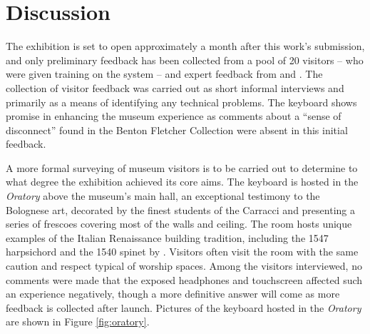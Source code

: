 \section{Discussion}\label{context}

The exhibition is set to open approximately a month after this work's submission, and only preliminary feedback has been collected from a pool of 20 visitors -- who were given training on the system -- and expert feedback from  and .
The collection of visitor feedback was carried out as short informal interviews and primarily as a means of identifying any technical problems.
The keyboard shows promise in enhancing the museum experience as comments about a ``sense of disconnect'' found in the Benton Fletcher Collection \cite{McAlpine2014} were absent in this initial feedback.


A more formal surveying of museum visitors is to be carried out to determine to what degree the exhibition achieved its core aims.
The keyboard is hosted in the \emph{Oratory} above the museum's main hall, an exceptional testimony to the Bolognese art, decorated by the finest students of the Carracci and presenting a series of frescoes covering most of the walls and ceiling. The room hosts unique examples of the Italian Renaissance building tradition, including the 1547 harpsichord and the 1540 spinet by . Visitors often visit the room with the same caution and respect typical of worship spaces. Among the visitors interviewed, no comments were made that the exposed headphones and touchscreen affected such an experience negatively, though a more definitive answer will come as more feedback is collected after launch. Pictures of the keyboard hosted in the \emph{Oratory} are shown in Figure \ref{fig:oratory}.

